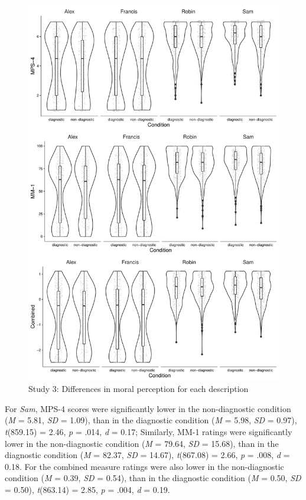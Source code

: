 \documentclass[
  american,
  man,mask,floatsintext]{apa6}
\begin{document}
\begin{figure}[!p]
\includegraphics{Supplementary_files/figure-latex/S3allscenariosPlot-1} \caption{Study 3: Differences in moral perception for each description}\label{fig:S3allscenariosPlot}
\end{figure}

For \emph{Sam}, MPS-4 scores were significantly lower in the non-diagnostic condition (\emph{M} = 5.81, \emph{SD} = 1.09), than in the diagnostic condition (\emph{M} = 5.98, \emph{SD} = 0.97), \emph{t}(859.15) = 2.46, \emph{p} = .014, \emph{d} = 0.17; Similarly, MM-1 ratings were significantly lower in the non-diagnostic condition (\emph{M} = 79.64, \emph{SD} = 15.68), than in the diagnostic condition (\emph{M} = 82.37, \emph{SD} = 14.67), \emph{t}(867.08) = 2.66, \emph{p} = .008, \emph{d} = 0.18. For the combined measure ratings were also lower in the non-diagnostic condition (\emph{M} = 0.39, \emph{SD} = 0.54), than in the diagnostic condition (\emph{M} = 0.50, \emph{SD} = 0.50), \emph{t}(863.14) = 2.85, \emph{p} = .004, \emph{d} = 0.19.
\end{document}
